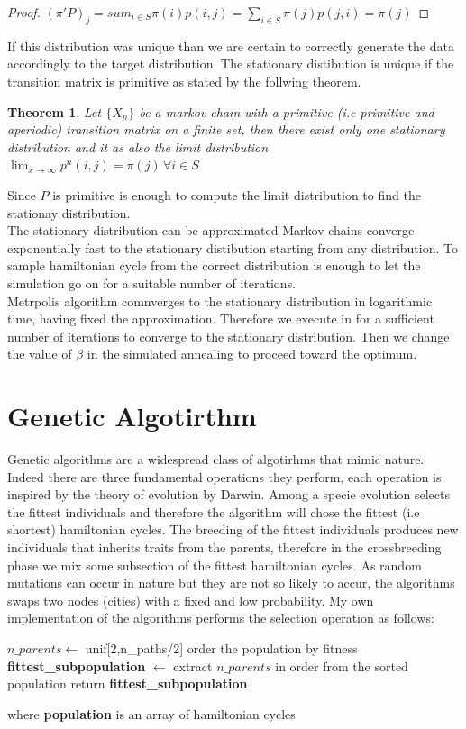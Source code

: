 \documentclass{article}
\newtheorem{theorem}{Theorem}
\begin{document}
\begin{proof}
$ (\pi'P)_j = sum_{i \in S} \pi(i)p(i,j) = \sum_{i \in S} \pi(j)p(j,i) = \pi(j) $ 
\end{proof}
If this distribution was unique than we are certain to correctly generate the data accordingly to the target distribution. The stationary distibution is unique if the transition matrix is primitive as stated by the follwing theorem.
\begin{theorem}
Let $\{X_n\}$ be a markov chain with a primitive (i.e primitive and aperiodic) transition matrix on a finite set, then  there exist only one stationary distribution and it as also the limit distribution $\lim_{x \to \infty} p^n(i,j) = \pi(j)\,  \forall i \in S$
\end{theorem}
Since $P$ is primitive is enough to compute the limit distribution to find the stationay distribution. \\
The stationary distribution can be approximated
Markov chains converge exponentially fast to the stationary distibution starting from any distribution. To sample hamiltonian cycle from the correct distribution is enough to let the simulation go on for a suitable number of iterations. \\
Metrpolis algorithm comnverges to the stationary distribution in logarithmic time, having fixed the approximation. Therefore we execute in for a sufficient number of iterations to converge to the stationary distribution. Then we change the value of $\beta$ in the simulated annealing to proceed toward the optimum.

\section{Genetic Algotirthm}
Genetic algorithms are a widespread class of algotirhms that mimic nature. Indeed there are three fundamental operations they perform, each operation is inspired by the theory of evolution by Darwin. Among a specie evolution selects the fittest individuals and therefore the algorithm will chose the fittest (i.e shortest) hamiltonian cycles. The breeding of the fittest individuals produces new individuals that inherits traits from the parents, therefore in the crossbreeding phase we mix some subsection of the fittest hamiltonian cycles.
As random mutations can occur in nature but they are not so likely to accur, the algorithms swaps two nodes (cities) with a fixed and low probability.
My own implementation of the algorithms performs the selection operation as follows:
\begin{algorithm}[H]
    \begin{algorithmic}[1]
        \State $n\_parents \leftarrow$ unif[2,n\_paths/2]
        \State order the population by fitness
        \State \textbf{fittest\_subpopulation} $\leftarrow$ extract $n\_parents$ in order from the sorted population
        \State return \textbf{fittest\_subpopulation}
       \EndFunction
\end{algorithmic}
\end{algorithm}
\noindent where \textbf{population} is an array of hamiltonian cycles
\end{document}

